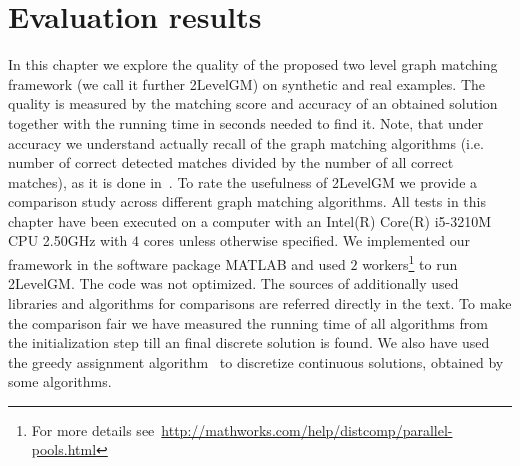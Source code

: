 \chapter{Evaluation results} \label{chapter:results}

In this chapter we explore the quality of the proposed two level graph matching framework (we call it further 2LevelGM) on synthetic and real examples. The quality is measured by the matching score and accuracy of an obtained solution together with the running time in seconds needed to find it. Note, that under accuracy we understand actually recall of the graph matching algorithms (i.e. number of correct detected matches divided by the number of all correct matches), as it is done in~\cite{Cho2010_RRWM,Cho2012_ProgressiveGM,Cho2014_Haystack,Duchenne2011,Rangarajan1996_GAGM,Leordeanu2005_SM,Leordeanu2009_IPFP}.
To rate the usefulness of 2LevelGM we provide a comparison study across different graph matching algorithms. All tests in this chapter have been executed on a computer with an Intel(R) Core(R) i5-3210M CPU 2.50GHz with $4$ cores unless otherwise specified. We implemented our framework in the software package MATLAB and used $2$ workers\footnote{For more details see~\url{http://mathworks.com/help/distcomp/parallel-pools.html}} to run 2LevelGM. The code was not optimized. The sources of additionally used libraries and algorithms for comparisons are referred directly in the text. %
To make the comparison fair we have measured the running time of all algorithms from the initialization step till an final discrete solution is found. We also have used the greedy assignment algorithm~\cite{Leordeanu2005_SM} to discretize continuous solutions, obtained by some algorithms.

